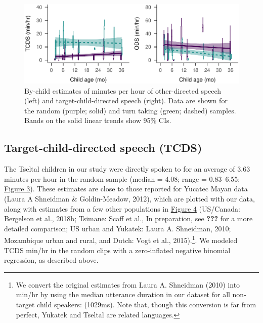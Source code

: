 \documentclass[floatsintext,man]{apa6}
\theoremstyle{definition}
\theoremstyle{definition}
\theoremstyle{definition}
\theoremstyle{remark}
\begin{document}
\begin{figure}
\centering
\includegraphics{Tseltal-CLE_files/figure-latex/fig3-1.pdf}
\caption{\label{fig:fig3}By-child estimates of minutes per hour of
other-directed speech (left) and target-child-directed speech (right).
Data are shown for the random (purple; solid) and turn taking (green;
dashed) samples. Bands on the solid linear trends show 95\% CIs.}
\end{figure}

\subsection{Target-child-directed speech
(TCDS)}\label{target-child-directed-speech-tcds}

The Tseltal children in our study were directly spoken to for an average
of 3.63 minutes per hour in the random sample (median = 4.08; range =
0.83--6.55; \protect\hyperlink{fig3}{Figure 3}). These estimates are
close to those reported for Yucatec Mayan data (Laura A Shneidman \&
Goldin-Meadow, 2012), which are plotted with our data, along with
estimates from a few other populations in
\protect\hyperlink{fig4}{Figure 4} (US/Canada: Bergelson et al., 2018b;
Tsimane: Scaff et al., In preparation, see {\textbf{???}} for a more
detailed comparison; US urban and Yukatek: Laura A. Shneidman, 2010;
Mozambique urban and rural, and Dutch: Vogt et al., 2015).\footnote{We
  convert the original estimates from Laura A. Shneidman (2010) into
  min/hr by using the median utterance duration in our dataset for all
  non-target child speakers: (1029ms). Note that, though this conversion
  is far from perfect, Yukatek and Tseltal are related languages.}. We
modeled TCDS min/hr in the random clips with a zero-inflated negative
binomial regression, as described above.
\end{document}
